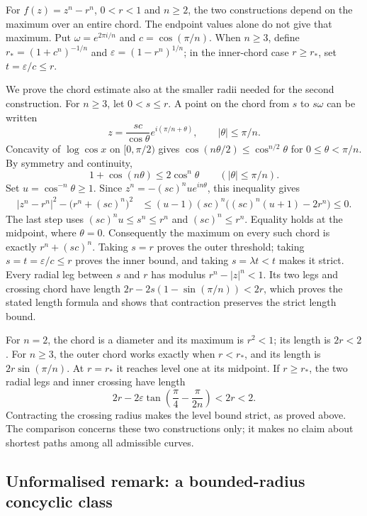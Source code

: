 For $f(z)=z^n-r^n$, $0<r<1$ and $n\ge2$, the two constructions depend on the maximum over an entire
chord. The endpoint values alone do not give that maximum. Put
$\omega=e^{2\pi i/n}$ and $c=\cos(\pi/n)$. When $n\ge3$, define
$r_*=(1+c^n)^{-1/n}$ and $\varepsilon=(1-r^n)^{1/n}$; in the inner-chord
case $r\ge r_*$, set $t=\varepsilon/c\le r$.

We prove the chord estimate also at the smaller radii needed for the
second construction. For $n\ge3$, let $0<s\le r$. A point on the chord
from $s$ to $s\omega$ can be written
\[
 z=\frac{sc}{\cos\theta}e^{i(\pi/n+\theta)},
 \qquad |\theta|\le\pi/n.
\]
Concavity of $\log\cos x$ on $[0,\pi/2)$ gives
$\cos(n\theta/2)\le\cos^{n/2}\theta$ for $0\le\theta<\pi/n$.
By symmetry and continuity,
\[
 1+\cos(n\theta)\le2\cos^n\theta
 \qquad (|\theta|\le\pi/n).
\]
Set $u=\cos^{-n}\theta\ge1$. Since
$z^n=-(sc)^nu e^{in\theta}$, this inequality gives
\[
 \begin{split}
 |z^n-r^n|^2-\bigl(r^n+(sc)^n\bigr)^2
 &\le (u-1)(sc)^n\bigl((sc)^n(u+1)-2r^n\bigr)\le0.
 \end{split}
\]
The last step uses $(sc)^nu\le s^n\le r^n$ and
$(sc)^n\le r^n$. Equality holds at the midpoint, where $\theta=0$.
Consequently the maximum on every such chord is exactly
$r^n+(sc)^n$. Taking $s=r$ proves the outer threshold; taking
$s=t=\varepsilon/c\le r$ proves the inner bound, and taking
$s=\lambda t<t$ makes it strict. Every radial leg between $s$ and
$r$ has modulus $r^n-|z|^n<1$. Its two legs and crossing chord have
length $2r-2s(1-\sin(\pi/n))<2r$, which proves the stated length
formula and shows that contraction preserves the strict length bound.

For $n=2$, the chord is a diameter and its maximum is $r^2<1$;
its length is $2r<2$. For $n\ge3$, the outer chord works exactly when
$r<r_*$, and its length is $2r\sin(\pi/n)$. At $r=r_*$ it reaches
level one at its midpoint. If $r\ge r_*$, the two radial legs and
inner crossing have length
\[
 2r-2\varepsilon\tan\left(\frac\pi4-\frac\pi{2n}\right)<2r<2.
\]
Contracting the crossing radius makes the level bound strict, as
proved above. The comparison concerns these two constructions only; it makes no
claim about shortest paths among all admissible curves.

\subsection*{Unformalised remark: a bounded-radius concyclic class}

